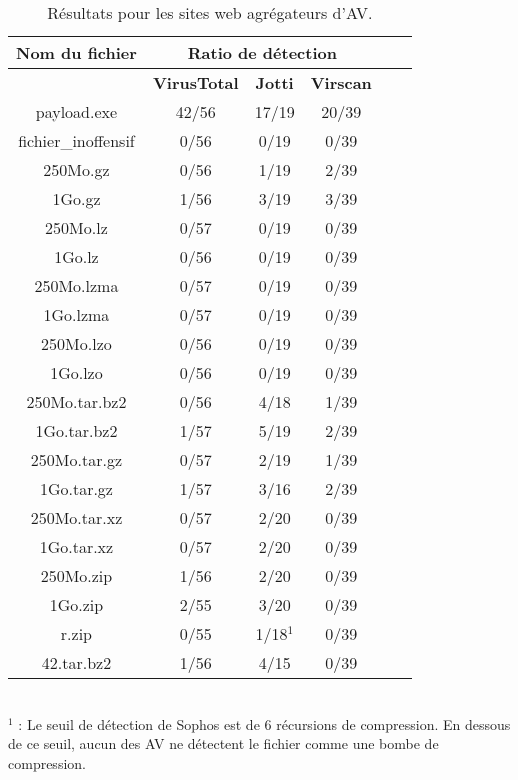 \documentclass{svjour3}
\begin{document}
\begin{table}[ht!]
\begin{normalsize}
\begin{center}
\begin{tabular}{|*{6}{c|}}
    \hline
    \textbf{Nom du fichier} & \multicolumn{3}{|c|}{\textbf{Ratio de détection}}\\
    \hline
  	 & \textbf{VirusTotal} & \textbf{Jotti} & \textbf{Virscan} \\
	\hline
payload.exe & 42/56 & 17/19 & 20/39\\
	\hline
fichier\_inoffensif & 0/56 & 0/19  & 0/39 \\
	\hline
	\hline
250Mo.gz & 0/56 & 1/19 & 2/39 \\
	\hline
1Go.gz &  1/56 & 3/19 & 3/39\\
    \hline
    \hline
250Mo.lz & 0/57 & 0/19 & 0/39\\
	\hline
1Go.lz & 0/56 & 0/19 & 0/39\\
    \hline
    \hline
250Mo.lzma & 0/57 & 0/19 & 0/39\\
	\hline
1Go.lzma & 0/57 & 0/19 & 0/39\\
    \hline
    \hline
250Mo.lzo & 0/56 & 0/19 & 0/39\\
	\hline
1Go.lzo & 0/56 & 0/19 & 0/39\\
    \hline
    \hline
250Mo.tar.bz2 & 0/56 & 4/18 & 1/39\\
	\hline
1Go.tar.bz2 & 1/57 & 5/19 & 2/39\\
    \hline
    \hline
250Mo.tar.gz & 0/57 & 2/19 & 1/39\\
	\hline
1Go.tar.gz & 1/57 & 3/16 & 2/39\\
    \hline
    \hline
250Mo.tar.xz & 0/57 & 2/20 & 0/39\\
	\hline
1Go.tar.xz & 0/57 & 2/20 & 0/39\\
    \hline
    \hline
250Mo.zip & 1/56 & 2/20 & 0/39\\
	\hline
1Go.zip & 2/55 & 3/20 & 0/39\\
    \hline
    \hline
r.zip & 0/55 & 1/18$^1$ & 0/39\\
	\hline
42.tar.bz2 & 1/56 & 4/15 & 0/39\\
	\hline
\end{tabular}
\end{center}
\caption{Résultats pour les sites web agrégateurs d'AV.}
\end{normalsize}
\end{table}
\\$^1$ : Le seuil de détection de Sophos est de 6 récursions de compression. En dessous de ce seuil, aucun des AV ne détectent le fichier comme une bombe de compression.\\
\end{document}
